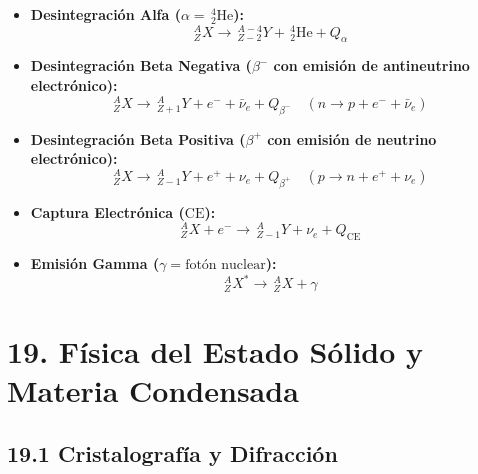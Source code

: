 \documentclass[11pt,a4paper]{article}
\begin{document}
\begin{itemize}
  \item \textbf{Desintegración Alfa ($\alpha = \,_2^4\mathrm{He}$):}
  \[
    _Z^A X \longrightarrow \,_{Z-2}^{A-4} Y + \,_2^4\mathrm{He} + Q_\alpha
  \]
  \item \textbf{Desintegración Beta Negativa ($\beta^-$ con emisión de antineutrino electrónico):}
  \[
    _Z^A X \longrightarrow \,_{Z+1}^A Y + e^- + \bar{\nu}_e + Q_{\beta^-} \quad (n \to p + e^- + \bar{\nu}_e)
  \]
  \item \textbf{Desintegración Beta Positiva ($\beta^+$ con emisión de neutrino electrónico):}
  \[
    _Z^A X \longrightarrow \,_{Z-1}^A Y + e^+ + \nu_e + Q_{\beta^+} \quad (p \to n + e^+ + \nu_e)
  \]
  \item \textbf{Captura Electrónica ($\mathrm{CE}$):}
  \[
    _Z^A X + e^- \longrightarrow \,_{Z-1}^A Y + \nu_e + Q_{\mathrm{CE}}
  \]
  \item \textbf{Emisión Gamma ($\gamma = \text{fotón nuclear}$):}
  \[
    _Z^A X^* \longrightarrow \,_Z^A X + \gamma
  \]
\end{itemize}

\section*{19. Física del Estado Sólido y Materia Condensada}

\subsection*{19.1 Cristalografía y Difracción}
\end{document}
